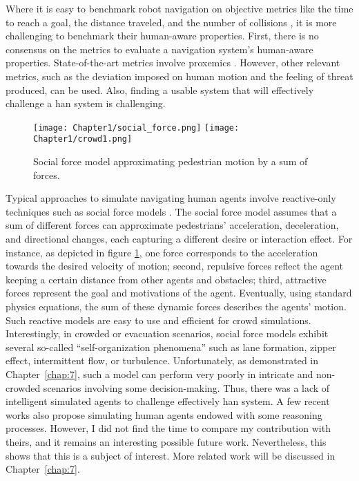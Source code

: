 Where it is easy to benchmark robot navigation on objective metrics like the time to reach a goal, the distance traveled, and the number of collisions \cite{perille2020benchmarking}, it is more challenging to benchmark their human-aware properties.
First, there is no consensus on the metrics to evaluate a navigation system's human-aware properties. State-of-the-art metrics involve proxemics \cite{samarakoon2022review}. However, other relevant metrics, such as the deviation imposed on human motion and the feeling of threat produced, can be used.
Also, finding a usable system that will effectively challenge a \acrfull{han} system is challenging. 

\begin{figure}
    \center
    \texttt{[image: Chapter1/social\_force.png]}
    \texttt{[image: Chapter1/crowd1.png]}
    \caption{Social force model approximating pedestrian motion by a sum of forces.}
    \label{fig:social_force_model}
\end{figure}

Typical approaches to simulate navigating human agents involve reactive-only techniques such as social force models \cite{helbing1995social,chen_social_2018}. 
The social force model assumes that a sum of different forces can approximate pedestrians' acceleration, deceleration, and directional changes, each capturing a different desire or interaction effect. For instance, as depicted in figure \ref{fig:social_force_model}, one force corresponds to the acceleration towards the desired velocity of motion; second, repulsive forces reflect the agent keeping a certain distance from other agents and obstacles; third, attractive forces represent the goal and motivations of the agent. Eventually, using standard physics equations, the sum of these dynamic forces describes the agents' motion.
Such reactive models are easy to use and efficient for crowd simulations. Interestingly, in crowded or evacuation scenarios, social force models exhibit several so-called ``self-organization phenomena'' such as lane formation, zipper effect, intermittent flow, or turbulence.
Unfortunately, as demonstrated in Chapter~\ref{chap:7}, such a model can perform very poorly in intricate and non-crowded scenarios involving some decision-making. Thus, there was a lack of intelligent simulated agents to challenge effectively \acrshort{han} system.
A few recent works also propose simulating human agents endowed with some reasoning processes. However, I did not find the time to compare my contribution with theirs, and it remains an interesting possible future work. Nevertheless, this shows that this is a subject of interest. More related work will be discussed in Chapter~\ref{chap:7}.
